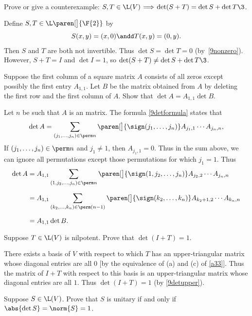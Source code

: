 
\exercise
Prove or give a counterexample: $S, T \in \L(V) \!\implies\! \det (S+T) = \det S + \det T\3$.

\begin{Solution}
Define $S, T \in \L\paren[\big]{\F{2}}$ by
\[
S(x,y) = (x, 0) \andd T(x,y) = (0,y).
\]
Then $S$ and $T$ are both not invertible.  Thus $\det S = \det T = 0$
(by~\ref{9nonzero}).  However, $S + T = I$ and $\det I = 1$, so
$\det (S+T) \ne \det S + \det T\3$.
\end{Solution}

\exercise
Suppose the first column of a square matrix $A$ consists of all zeros except possibly the first entry $A_{1,1}$. Let $B$ be the matrix obtained from $A$ by deleting the first row and the first column of $A$. Show that $\det A = A_{1,1} \det B$.

\begin{Solution}
Let $n$ be such that $A$ is an  matrix. The formula \ref{9detformula} states that
\[
\det A = \sum_{(j_1, \ldots, j_n) \in \perm n} \paren[\big]{ \sign(j_1, \ldots, j_n) } A_{j_1,1} \cdots A_{j_n,n},
\]
If $(j_1, \ldots, j_n) \in \perm n$ and $j_1 \ne 1$, then $A_{j_1, 1} = 0$. Thus in the sum above, we can ignore all permutations except those permutations for which $j_1 = 1$. Thus
\begin{align*}
\det A &= A_{1,1} \sum_{(1, j_2, \ldots, j_n) \in \perm n} \paren[\big]{ \sign(1, j_2, \ldots, j_n) } A_{j_2,2} \cdots A_{j_n,n} \\[6bp]
&= A_{1,1} \sum_{(k_2, \ldots, k_n) \in \perm (n-1)} \paren[\big]{ \sign(k_2, \ldots, k_n) } A_{k_2+1,2} \cdots A_{k_n,n} \\[6bp]
&= A_{1,1} \det B.
\end{align*}
\end{Solution}

\exercise
Suppose $T \in \L(V)$ is nilpotent. Prove that $\det(I + T) = 1$.

\begin{Solution}
There exists a basis of $V$ with respect to which $T$ has an upper-triangular matrix whose diagonal entries are all $0$ [by the equivalence of (a) and (c) of \ref{a33}]. Thus the matrix of $I + T$ with respect to this basis is an upper-triangular matrix whose diagonal entries are all $1$. Thus $\det(I + T) = 1$ (by \ref{9detupper}).
\end{Solution}

\exercise
Suppose $S \in \L(V)$. Prove that $S$ is unitary if and only if $\abs{\det S} = \norm{S} = 1$.

